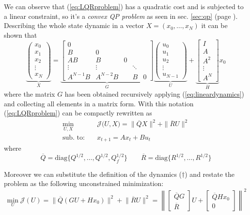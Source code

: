 	We can observe that (\ref{eq:LQRproblem}) has a quadratic cost and is subjected to a linear constraint, so it's a \textit{convex QP problem} as seen in sec. \ref{sec:qp} (page \pageref{sec:qp}). Describing the whole state dynamic in a vector $X=(x_0,\dots, x_N)$ it can be shown that
	\[ \tag{$\dagger$}
	\underbrace{\begin{pmatrix}
			x_0 \\ x_1 \\ x_2 \\ \vdots \\ x_N
	\end{pmatrix}}_{X} = \underbrace{\begin{bmatrix}
		0 \\
		B & 0 \\
		AB & B  & 0 \\
		\vdots & \vdots & & \ddots \\ 
		A^{N-1}B & A^{N-2}B & & B & 0 
	\end{bmatrix}}_G 
	\underbrace{\begin{pmatrix}
		u_0 \\ u_1 \\ u_2 \\ \vdots \\ u_{N-1}
	\end{pmatrix}}_U + 
	\underbrace{\begin{bmatrix}
		I \\ A \\ A^2 \\ \vdots \\ A^N
	\end{bmatrix}}_H x_0
	\]
	where the matrix $G$ has been obtained recursively applying (\ref{eq:lineardynamics}) and collecting all elements in a matrix form. With this notation (\ref{eq:LQRproblem}) can be compactly rewritten as
	\begin{equation} \label{eq:LQRcompact}
		\begin{aligned}
			\min_{U,X} \quad & \mathcal J\big(U,X\big) = \|\overline Q X\|^2 + \|\overline R U \|^2 \\
			\textrm{sub. to:} \quad & x_{t+1} = A x_t + B u_t
		\end{aligned}
	\end{equation}
	where
	\[ \overline Q = \textrm{diag}\big\{ Q^{1/2}, \dots, Q^{1/2}, Q_f^{1/2} \big\} \qquad \overline R = \textrm{diag}\big\{ R^{1/2}, \dots, R^{1/2}\big\} \]
	
	Moreover we can substitute the definition of the dynamics ($\dagger$) and restate the problem as the following unconstrained minimization:\\
	\begin{equation}
		\min_U \mathcal J(U) = \big\| \overline Q(GU+Hx_0) \big\|^2 + \big\|\overline RU\big\|^2 = \left\| \begin{bmatrix}
			\overline QG \\ \overline R
		\end{bmatrix} U + \begin{bmatrix}
		 	\overline Q H x_0 \\ 0
		\end{bmatrix} \right\|^2
	\end{equation}
	
